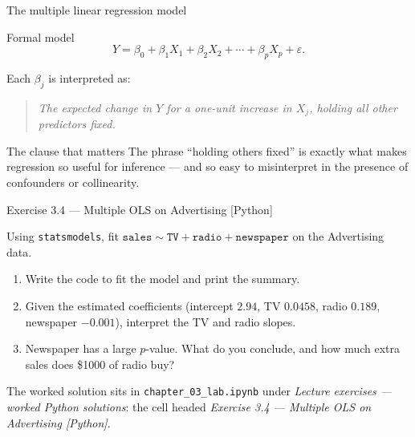 \documentclass[aspectratio=169,11pt]{beamer}
\begin{document}
\begin{frame}{The multiple linear regression model}
  \begin{block}{Formal model}
    \[
      \boxed{\;
        Y = \beta_0 + \beta_1 X_1 + \beta_2 X_2 + \cdots + \beta_p X_p
            + \varepsilon.
      \;}
    \]
  \end{block}
  Each $\beta_j$ is interpreted as:
  \begin{quote}
    \emph{The expected change in $Y$ for a one-unit increase in $X_j$,
    holding all other predictors fixed.}
  \end{quote}
  \begin{alertblock}{The clause that matters}
    The phrase ``holding others fixed'' is exactly what makes regression
    so useful for inference --- and so easy to misinterpret in the
    presence of confounders or collinearity.
  \end{alertblock}
\end{frame}


\begin{frame}[fragile]{Exercise 3.4 --- Multiple OLS on Advertising [Python]}
  \begin{exercise}
    Using \texttt{statsmodels}, fit
    $\texttt{sales} \sim \texttt{TV}+\texttt{radio}+\texttt{newspaper}$
    on the Advertising data.
    \begin{enumerate}
      \item Write the code to fit the model and print the summary.
      \item Given the estimated coefficients
            (intercept $2.94$, TV $0.0458$, radio $0.189$,
            newspaper $-0.001$), interpret the TV and radio slopes.
      \item Newspaper has a large $p$-value. What do you conclude, and
            how much extra sales does \$1000 of radio buy?
    \end{enumerate}
  \end{exercise}
  \begin{labnote}
    The worked solution sits in \texttt{chapter\_03\_lab.ipynb} under
    \emph{Lecture exercises --- worked Python solutions}: the cell headed
    \emph{Exercise 3.4 --- Multiple OLS on Advertising [Python]}.
  \end{labnote}
\end{frame}
\end{document}
